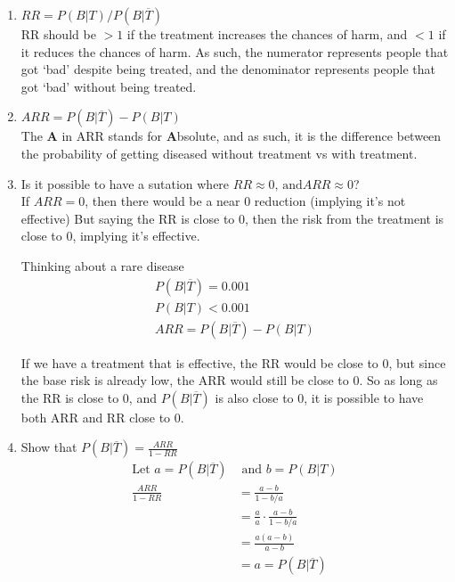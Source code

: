 \documentclass{article}
\begin{document}
\begin{enumerate}[label=\alph*)]
    \item \(RR = P(B \vert T) / P(B \vert \overline{T})\) \\
          RR should be \(> 1\) if the treatment increases the chances of harm, and \(< 1\) if it reduces the chances of harm.
          As such, the numerator represents people that got `bad' despite being treated, and the denominator represents people that got `bad' without being treated.
    \item \(ARR = P(B \vert \overline{T}) - P(B \vert T)\) \\
          The \textbf{A} in ARR stands for \textbf{A}bsolute, and as such, it is the difference between the probability of getting diseased without treatment vs with treatment.
    \item Is it possible to have a sutation where \(RR \approx 0 \text{, and} ARR \approx 0\)? \\
          If \(ARR = 0\), then there would be a near 0 reduction (implying it's not effective)
          But saying the RR is close to 0, then the risk from the treatment is close to 0, implying it's effective.

          Thinking about a rare disease
          \begin{align*}
              P(B \vert \overline{T}) = 0.001 \\
              P(B \vert T) < 0.001            \\
              ARR = P(B \vert \overline{T}) - P(B \vert T)
          \end{align*}

          If we have a treatment that is effective, the RR would be close to 0, but since the base risk is already low, the ARR would still be close to 0.
          So as long as the RR is close to 0, and \(P(B \vert \overline{T})\) is also close to 0, it is possible to have both ARR and RR close to 0.
    \item Show that \(P(B \vert \overline{T}) = \frac{ARR}{1-RR}\)
          \begin{align*}
              \text{Let } a = P(B \vert \overline{T}) & \text{ and } b = P(B \vert T)           \\
              \frac{
                  ARR
              }{
                  1-RR
              }                                       & = \frac{a - b}{ 1 - b/a}                \\
                                                      & = \frac{a}{a} \cdot \frac{a-b}{1 - b/a} \\
                                                      & = \frac{a(a-b)}{a-b}                    \\
                                                      & = a =P(B \vert \overline{T})
          \end{align*}
\end{enumerate}
\end{document}

